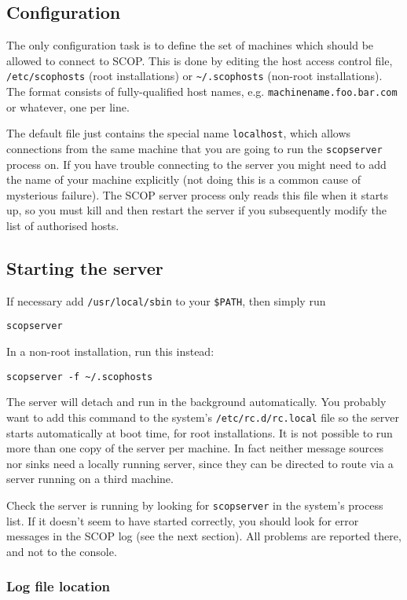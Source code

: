 \documentclass[12pt,a4paper,twoside]{article}
\renewcommand{\_}{\texttt{\symbol{95}}}
\begin{document}
\subsection{Configuration}

The only configuration task is to define the set of machines which
should be allowed to connect to SCOP. This is done by editing the host
access control file, \texttt{/etc/scophosts} (root installations) or
\verb=~/.scophosts= (non-root installations). The format consists of
fully-qualified host names, e.g. \texttt{machinename.foo.bar.com} or
whatever, one per line.

The default file just contains the special name \texttt{localhost},
which allows connections from the same machine that you are going to
run the \texttt{scopserver} process on. If you have trouble connecting
to the server you might need to add the name of your machine explicitly
(not doing this is a common cause of mysterious failure). The SCOP
server process only reads this file when it starts up, so you must kill
and then restart the server if you subsequently modify the list of
authorised hosts.

\subsection{Starting the server}
\label{starting}

If necessary add \texttt{/usr/local/sbin} to your \verb=$PATH=,
then simply run

\texttt{scopserver}

In a non-root installation, run this instead:

\verb=scopserver -f ~/.scophosts=

The server will detach and run in the background automatically. You
probably want to add this command to the system's
\texttt{/etc/rc.d/rc.local} file so the server starts automatically at
boot time, for root installations. It is not possible to run more than
one copy of the server per machine. In fact neither message sources nor
sinks need a locally running server, since they can be directed to
route via a server running on a third machine.

Check the server is running by looking for \texttt{scopserver} in the
system's process list. If it doesn't seem to have started correctly,
you should look for error messages in the SCOP log (see the next
section). All problems are reported there, and not to the console.

\subsubsection*{Log file location}
\end{document}
